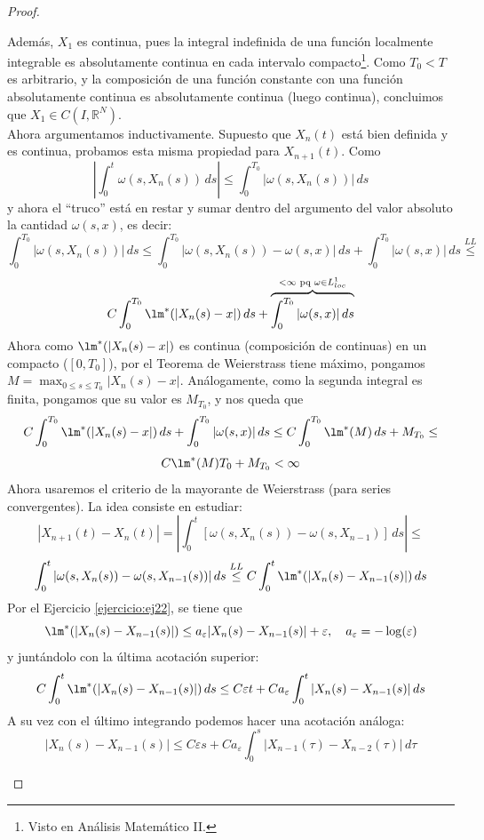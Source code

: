 \begin{proof}
\begin{itemize}
        Además, $X_1$ es continua, pues la integral indefinida
        de una función localmente integrable es absolutamente
        continua en cada intervalo compacto\footnote{Visto en Análisis Matemático II.}. Como $T_0<T$ es
        arbitrario, y la composición de una función constante con una función absolutamente continua es absolutamente continua (luego continua), concluimos que $X_1\in C(I,\mathbb{R}^N)$. \\

        Ahora argumentamos inductivamente. Supuesto que $X_n(t)$ está bien definida y es continua, probamos esta misma propiedad para $X_{n+1}(t)$.
        Como
        $$\left|\int_{0}^{t} \omega(s,X_n(s))\,ds \right| \leq \int_{0}^{T_0} |\omega(s,X_n(s))|\,ds$$
        y ahora el ``truco'' está en restar y sumar dentro del argumento del valor absoluto la cantidad $\omega(s,x)$, es decir:
        $$\int_{0}^{T_0} |\omega(s,X_n(s))|\,ds \leq \int_{0}^{T_0} |\omega(s,X_n(s)) - \omega(s,x)|\,ds + \int_{0}^{T_0} |\omega(s,x)|\,ds
        \stackrel{LL}{\leq}$$
        $$C\int_{0}^{T_0} \lm^{*}(|X_n(s) - x|)\,ds + \overbrace{\int_{0}^{T_0} |\omega(s,x)|\,ds}^{<\infty \text{ pq } \omega \in L^1_{loc}}$$
        Ahora como $\lm^{*}(|X_n(s) - x|)$ es continua (composición de continuas) en un compacto ($[0,T_0]$), por el Teorema de Weierstrass 
        tiene máximo, pongamos $M = \max_{0 \leq s \leq T_0} |X_n(s) - x|$. Análogamente, como la segunda integral es finita, pongamos
        que su valor es $M_{T_0}$, y nos queda que 
        $$C\int_{0}^{T_0} \lm^{*}(|X_n(s) - x|)\,ds + \int_{0}^{T_0} |\omega(s,x)|\,ds \leq C \int_{0}^{T_0} \lm^{*}(M)\,ds + M_{T_0} \leq$$
        $$C \lm^{*}(M)T_0 + M_{T_0} < \infty$$
        Ahora usaremos el criterio de la mayorante de Weierstrass (para series convergentes). La idea consiste en estudiar:
        $$|X_{n+1}(t) - X_n(t)| = \left| \int_{0}^{t} \left[ \omega(s,X_n(s)) - \omega(s,X_{n-1}) \right] \,ds \right| \leq$$
        $$\int_{0}^{t} |\omega(s,X_n(s)) - \omega(s,X_{n-1}(s))|\,ds \stackrel{LL}{\leq} C \int_{0}^{t} \lm^{*}(|X_n(s) - X_{n-1}(s)|)\,ds$$
        Por el Ejercicio \ref{ejercicio:ej22}, se tiene que 
        $$\lm^{*}(|X_n(s) - X_{n-1}(s)|) \leq a_{\varepsilon} |X_n(s) - X_{n-1}(s)| + \varepsilon, \quad a_{\varepsilon} = -\log(\varepsilon)$$
        y juntándolo con la última acotación superior:
        $$C \int_{0}^{t} \lm^{*}(|X_n(s) - X_{n-1}(s)|)\,ds \leq C \varepsilon t + C a_{\varepsilon} \int_{0}^{t} |X_n(s) - X_{n-1}(s)|\,ds$$
        A su vez con el último integrando podemos hacer una acotación análoga:
        $$|X_n(s) - X_{n-1}(s)| \leq C \varepsilon s + C a_{\varepsilon} \int_{0}^{s} |X_{n-1}(\tau) - X_{n-2}(\tau)|\,d \tau$$

\end{itemize}
\end{proof}
